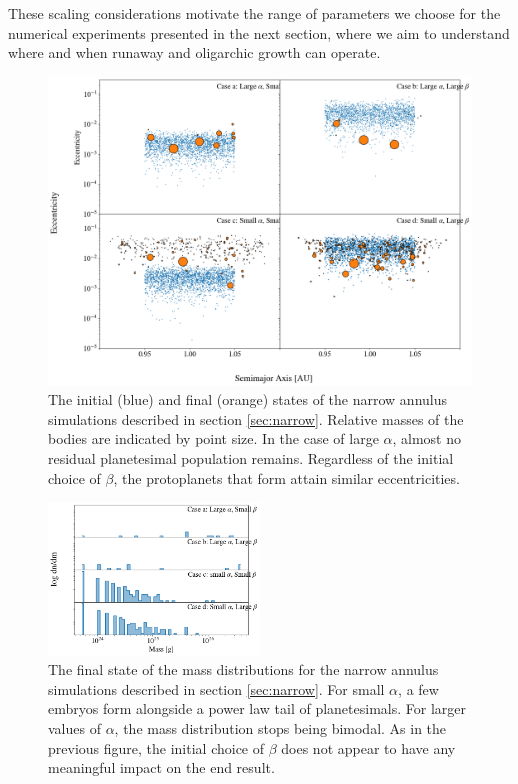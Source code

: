 \documentclass[twocolumn,linenumbers]{aastex63}
\begin{document}
These scaling considerations motivate the range of parameters we choose for the numerical experiments presented in the next section, where we aim to understand where and when runaway and oligarchic growth can operate.

\begin{figure}
\begin{center}
    \includegraphics[width=\textwidth]{figures/alpha_beta.png}
    \caption{The initial (blue) and final (orange) states of the narrow annulus simulations described in section \ref{sec:narrow}. 
    Relative masses of the bodies are indicated by point size. In the case of large $\alpha$, almost no residual planetesimal 
    population remains. Regardless of the initial choice of $\beta$, the protoplanets that form attain similar eccentricities. 
    \label{fig:alpha_beta}}
\end{center}
\end{figure}

\begin{figure}
\begin{center}
    \includegraphics[width=0.5\textwidth]{figures/alpha_beta_mass.png}
    \caption{The final state of the mass distributions for the
      narrow annulus simulations described in section \ref{sec:narrow}. For small
      $\alpha$, a few embryos form alongside a power law tail of
      planetesimals. For larger values of $\alpha$, the mass distribution stops being bimodal. 
      As in the previous figure, the initial choice of $\beta$ does not appear to have any meaningful impact on the end result.
      \label{fig:alpha_beta_mass}}
\end{center}
\end{figure}
\end{document}
